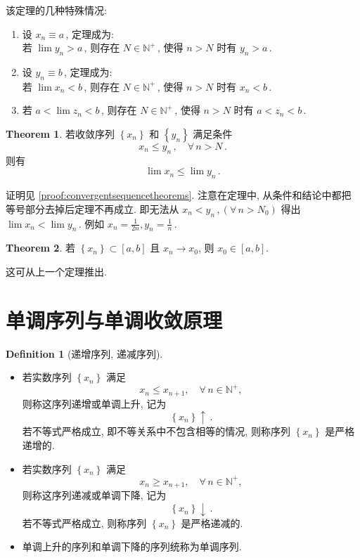 \documentclass{book}
\newcommand{\Any}{\forall\,}
\newcommand{\set}[1]{\left\{#1\right\}}
\newcommand{\N}{\mathbb{N}}
\renewcommand{\ge}{\geqslant}
\renewcommand{\le}{\leqslant}
\numberwithin{equation}{section}
\numberwithin{figure}{section}
\theoremstyle{definition}
\newtheorem{definition}{Definition}
\newtheorem{theorem}{Theorem}[section]
\begin{document}
该定理的几种特殊情况:
\begin{enumerate}
  \item 设 $x_n\equiv a$\,, 定理成为:\\
    若 $\lim y_n>a$\,, 则存在 $N\in\N^+$\,, 使得 $n>N$ 时有 $y_n>a$\,.
  \item 设 $y_n\equiv b$\,, 定理成为:\\
    若 $\lim x_n<b$\,, 则存在 $N\in\N^+$\,, 使得 $n>N$ 时有 $x_n<b$\,.
  \item 若 $a<\lim z_n<b$\,, 则存在 $N\in\N^+$\,, 使得 $n>N$ 时有 $a<z_n<b$\,.
\end{enumerate}

\begin{theorem}
  若收敛序列 $\set{x_n}$ 和 $\set{y_n}$ 满足条件
  \begin{equation*}
    x_n\le y_n\,,\quad\Any n>N\,.
  \end{equation*}
  则有
  \begin{equation*}
    \lim x_n\le\lim y_n\,.
  \end{equation*}
  \label{the:fromInequalToLimit}
\end{theorem}
证明见 \cref{proof:convergentsequencetheorems}. 注意在定理中, 从条件和结论中都把等号部分去掉后定理不再成立. 即无法从 $x_n<y_n\,,(\Any n>N_0)$ 得出 $\lim x_n<\lim y_n$\,. 例如 $x_n=\frac{1}{2n},y_n=\frac{1}{n}$\,.

\begin{theorem}
  若 $\set{x_n}\subset[a,b]$ 且 $x_n\to x_0$, 则 $x_0\in [a,b]$.
\end{theorem}
这可从上一个定理推出.

\section{单调序列与单调收敛原理}
\begin{definition}[递增序列, 递减序列]
  \leavevmode

  \begin{itemize}
    \item 若实数序列 $\set{x_n}$ 满足
      \begin{equation*}
	x_n\le x_{n+1},\quad\Any n\in\N^+,
      \end{equation*}
      则称这序列递增或单调上升, 记为
      \begin{equation*}
	\set{x_n}\uparrow\,.
      \end{equation*}
      若不等式严格成立, 即不等关系中不包含相等的情况, 则称序列 $\set{x_n}$ 是严格递增的.
    \item 若实数序列 $\set{x_n}$ 满足
      \begin{equation*}
	x_n\ge x_{n+1},\quad\Any n\in\N^+,
      \end{equation*}
      则称这序列递减或单调下降, 记为
      \begin{equation*}
	\set{x_n}\downarrow\,.
      \end{equation*}
      若不等式严格成立, 则称序列 $\set{x_n}$ 是严格递减的.
    \item 单调上升的序列和单调下降的序列统称为单调序列.
  \end{itemize}
\end{definition}
\end{document}
